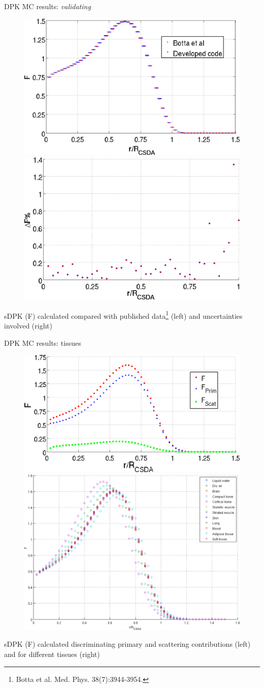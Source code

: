 \documentclass[ignorenonframetext,]{beamer}
\begin{document}
\begin{frame}{DPK MC results: \emph{validating}}
\protect\hypertarget{dpk-mc-results-validating}{}

\begin{figure}
\centering
\includegraphics[height=.31\textwidth]{imgs/dpk_validation.png}
\includegraphics[height=.31\textwidth]{imgs/dpk_validation_err.png}
\end{figure}

sDPK (F) calculated compared with published
data\footnote{Botta et al. Med. Phys. 38(7):3944-3954.} (left) and
uncertainties involved (right)

\end{frame}

\begin{frame}{DPK MC results: tissues}
\protect\hypertarget{dpk-mc-results-tissues}{}

\begin{figure}
\centering
\includegraphics[height=.3\textwidth]{imgs/dpk_discriminacion.png}
\includegraphics[height=.3\textwidth]{imgs/dpk_tissues.png}
\end{figure}

sDPK (F) calculated discriminating primary and scattering contributions
(left) and for different tissues (right)

\end{frame}
\end{document}
